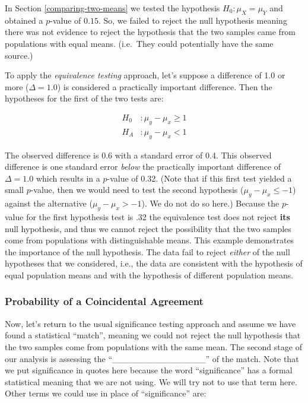 \documentclass[]{book}
\theoremstyle{definition}
\theoremstyle{definition}
\theoremstyle{remark}
\begin{document}
In Section \ref{comparing-two-means} we tested the hypothesis
\(H_0 : \mu_X = \mu_Y\) and obtained a \(p\)-value of \(0.15\). So, we
failed to reject the null hypothesis meaning there was not evidence to
reject the hypothesis that the two samples came from populations with
equal means. (i.e.~They could potentially have the same source.)

To apply the \emph{equivalence testing} approach, let's suppose a
difference of 1.0 or more (\(\Delta = 1.0\)) is considered a practically
important difference. Then the hypotheses for the first of the two tests
are:

\begin{equation}\label{eq:eth1}
\begin{split}
H_0 & : \mu_y - \mu_x \geq 1 \\
H_A & : \mu_y - \mu_x < 1 
\end{split}
\end{equation}

The observed difference is 0.6 with a standard error of 0.4. This
observed difference is one standard error \emph{below} the practically
important difference of \(\Delta = 1.0\) which results in a \(p\)-value
of 0.32. (Note that if this first test yielded a small \(p\)-value, then
we would need to test the second hypothesis (\(\mu_y - \mu_x \leq -1\))
against the alternative (\(\mu_y - \mu_x > -1\)). We do not do so here.)
Because the \(p\)-value for the first hypothesis test is .32 the
equivalence test does not reject \textbf{its} null hypothesis, and thus
we cannot reject the possibility that the two samples come from
populations with distinguishable means. This example demonstrates the
importance of the null hypothesis. The data fail to reject \emph{either}
of the null hypotheses that we considered, i.e., the data are consistent
with the hypothesis of equal population means and with the hypothesis of
different population means.

\subsubsection{Probability of a Coincidental
Agreement}\label{probability-of-a-coincidental-agreement}

Now, let's return to the usual significance testing approach and assume
we have found a statistical ``match'', meaning we could not reject the
null hypothesis that the two samples come from populations with the same
mean. The second stage of our analysis is assessing the
``\_\_\_\_\_\_\_\_\_\_\_\_\_\_\_'' of the match. Note that we put
significance in quotes here because the word ``significance'' has a
formal statistical meaning that we are not using. We will try not to use
that term here. Other terms we could use in place of ``significance''
are:
\end{document}
